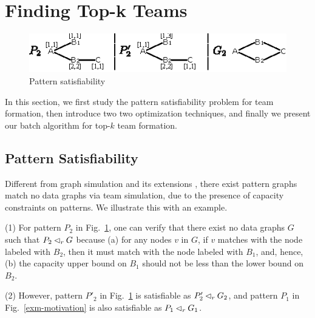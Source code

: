 \section{Finding Top-k Teams}
\label{sec-tsimAlg}


\begin{figure}[tb!]
	\begin{center}
		\includegraphics[scale=1.38]{./fig/consistency_motivation.eps}
	\end{center}
	\vspace{-3ex}
	\caption{Pattern satisfiability}
	\vspace{-4ex}
	\label{fig-consistency-example}
\end{figure}

In this section, we first study the pattern satisfiability problem for team formation, then introduce two  two optimization techniques, and finally we present our  batch algorithm for top-$k$ team formation.



\subsection{Pattern Satisfiability}
Different from graph simulation \cite{infsimu95} and its extensions \cite{FanLMTWW10,MaCFHW14},
there exist pattern graphs match no data graphs via team simulation, due to the presence of capacity constraints on patterns. We illustrate this with an example.

\begin{example}
\label{exm-consistency}
\ni(1) For pattern $P_2$ in Fig.~\ref{fig-consistency-example},
one can verify that there exist no data graphs $G$ such that $P_2 \lhd_r G$ because (a) for any nodes $v$ in $G$, if $v$ matches with the node labeled with $B_2$, then it must match with the node labeled with $B_1$, and, hence, (b) the capacity upper bound on $B_1$ should not be less than the lower bound on $B_2$.

\sstab(2) However, pattern $P'_2$ in Fig.~\ref{fig-consistency-example} is satisfiable as $P'_2 \lhd_r G_2$, and pattern $P_1$ in Fig.~\ref{exm-motivation} is also satisfiable as $P_1 \lhd_r G_1$.
\end{example}


